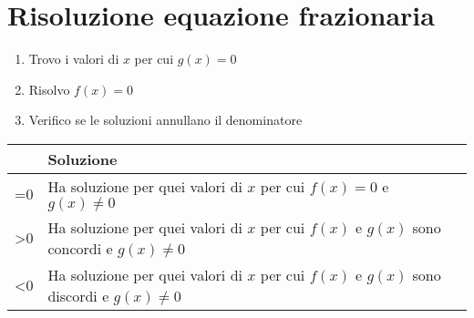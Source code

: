 \section{Risoluzione equazione frazionaria}
\begin{enumerate}
	\item Trovo i valori di $x$ per cui $g(x)=0$
	\item Risolvo $f(x)=0$ 
	\item Verifico se le soluzioni annullano il denominatore 
\end{enumerate}
\begin{center}
	\begin{tabular}{Cp{0.4\textwidth}}
\toprule
	& Soluzione \\ 
\midrule
{}=0	& Ha soluzione per quei valori di $x$ per cui $f(x)=0$ e $g(x)\neq 0$  \\ 
>0	& Ha soluzione per quei valori di $x$ per cui $f(x)$ e $g(x)$ sono concordi e $g(x)\neq 0$  \\ 
<0	& Ha soluzione per quei valori di $x$ per cui $f(x)$ e $g(x)$ sono discordi e $g(x)\neq 0$  \\ 
\bottomrule
\end{tabular}
\end{center}